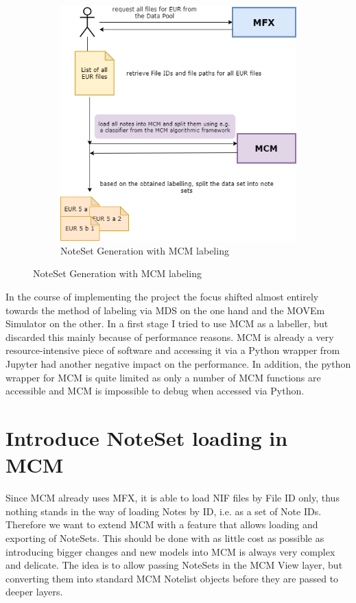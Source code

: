 \begin{figure}
\begin{subfigure}[b]{0.45\textwidth}
   \includegraphics[width=1\linewidth]{images/label_mcm_approach.png}
   \caption{NoteSet Generation with MCM labeling}
   \label{fig:ns_mcm}
\end{subfigure}

\end{figure}

In the course of implementing the project the focus shifted almost entirely towards the method of labeling via MDS on the one hand and the MOVEm Simulator on the other. In a first stage I tried to use MCM as a labeller, but discarded this mainly because of performance reasons. MCM is already a very resource-intensive piece of software and accessing it via a Python wrapper from Jupyter had another negative impact on the performance. In addition, the python wrapper for MCM is quite limited as only a number of MCM functions are accessible and MCM is impossible to debug when accessed via Python. \par

\section{Introduce NoteSet loading in MCM}
Since MCM already uses MFX, it is able to load NIF files by File ID only, thus nothing stands in the way of loading Notes by ID, i.e. as a set of Note IDs. Therefore we want to extend MCM with a feature that allows loading and exporting of NoteSets. This should be done with as little cost as possible as introducing bigger changes and new models into MCM is always very complex and delicate. The idea is to allow passing NoteSets in the MCM View layer, but converting them into standard MCM Notelist objects before they are passed to deeper layers. 
